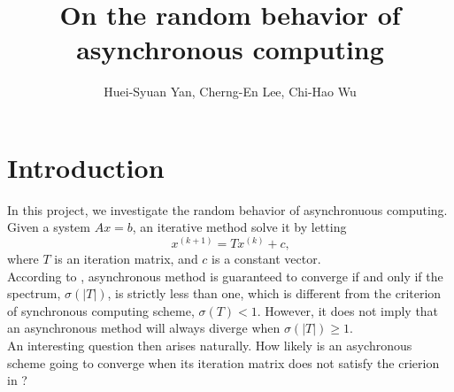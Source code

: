 \documentclass[12pt]{article}
\begin{document}
 
 
\title{On the random behavior of asynchronous computing}
\author{Huei-Syuan Yan, Cherng-En Lee, Chi-Hao Wu}
\maketitle

\section{Introduction}
   In this project, we investigate the random behavior of asynchronuous computing. Given a system $Ax = b$, an iterative method solve it by letting
   \[
      x^{(k+1)} = T x^{(k)} + c \text{,}
   \]
   where $T$ is an iteration matrix, and $c$ is a constant vector. \\[5pt]
   According to \cite{C-M}, asynchronous method is guaranteed to converge if and only if the spectrum, $\sigma(|T|)$, is strictly less than one, which is different from the criterion of synchronous computing scheme, $\sigma(T) < 1$. However, it does not imply that an asynchronous method will always diverge when $\sigma(|T|) \geq 1$. \\[5pt]
   An interesting question then arises naturally. How likely is an asychronous scheme going to converge when its iteration matrix does not satisfy the crierion in \cite{C-M}?
\end{document}
